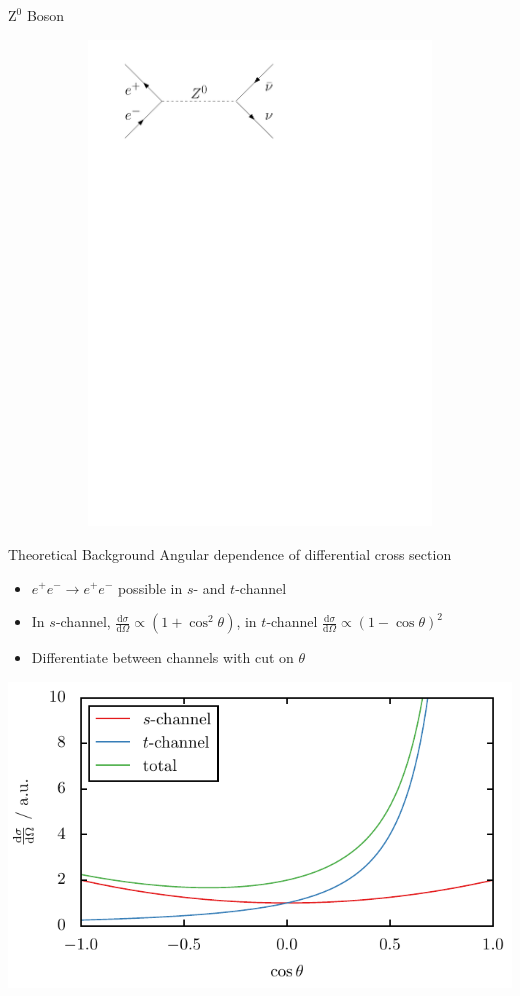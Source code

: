 \documentclass[11pt,xcolor=dvipsnames,professionalfonts]{beamer}
\begin{document}
\begin{frame}{$\mathrm{Z}^0$ Boson}
\begin{figure}[htb]
\begin{subfigure}{.28\textwidth}
		\end{subfigure}
		\begin{subfigure}{.28\textwidth}
			\centering
			\includegraphics[width=.8\textwidth]{./figures/theory/feynman/nn}
		\end{subfigure}
	\end{figure}
\end{frame}

\begin{frame}{Theoretical Background}
	Angular dependence of differential cross section
	\begin{itemize}
		\item $e^+e^-\rightarrow e^+e^-$ possible in $s$- and $t$-channel
		\item In $s$-channel, $\frac{\mathrm{d}\sigma}{\mathrm{d}\Omega}\propto(1+\cos^2\theta)$, in $t$-channel $\frac{\mathrm{d}\sigma}{\mathrm{d}\Omega}\propto(1-\cos\theta)^2$
		\item Differentiate between channels with cut on $\theta$
	\end{itemize}
	\vspace{.5em}
	\centering
	\includegraphics[width=.7\textwidth]{./talkfigs/pdf/s_t_channel}
\end{frame}
\end{document}
